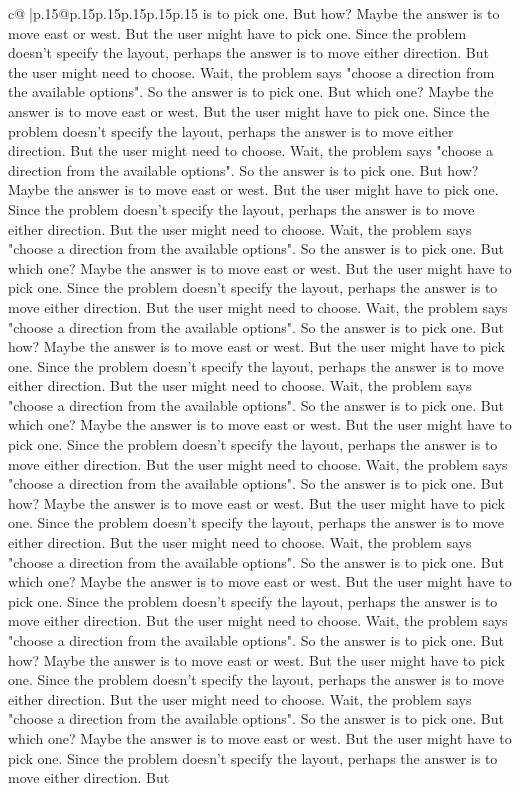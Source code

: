 \documentclass{article}
\begin{document}
{\begin{supertabular}{c@{$\;$}|p{.15\linewidth}@{}p{.15\linewidth}p{.15\linewidth}p{.15\linewidth}p{.15\linewidth}p{.15\linewidth}}
{{{is to pick one. But how? Maybe the answer is to move east or west. But the user might have to pick one. Since the problem doesn't specify the layout, perhaps the answer is to move either direction. But the user might need to choose. Wait, the problem says "choose a direction from the available options". So the answer is to pick one. But which one? Maybe the answer is to move east or west. But the user might have to pick one. Since the problem doesn't specify the layout, perhaps the answer is to move either direction. But the user might need to choose. Wait, the problem says "choose a direction from the available options". So the answer is to pick one. But how? Maybe the answer is to move east or west. But the user might have to pick one. Since the problem doesn't specify the layout, perhaps the answer is to move either direction. But the user might need to choose. Wait, the problem says "choose a direction from the available options". So the answer is to pick one. But which one? Maybe the answer is to move east or west. But the user might have to pick one. Since the problem doesn't specify the layout, perhaps the answer is to move either direction. But the user might need to choose. Wait, the problem says "choose a direction from the available options". So the answer is to pick one. But how? Maybe the answer is to move east or west. But the user might have to pick one. Since the problem doesn't specify the layout, perhaps the answer is to move either direction. But the user might need to choose. Wait, the problem says "choose a direction from the available options". So the answer is to pick one. But which one? Maybe the answer is to move east or west. But the user might have to pick one. Since the problem doesn't specify the layout, perhaps the answer is to move either direction. But the user might need to choose. Wait, the problem says "choose a direction from the available options". So the answer is to pick one. But how? Maybe the answer is to move east or west. But the user might have to pick one. Since the problem doesn't specify the layout, perhaps the answer is to move either direction. But the user might need to choose. Wait, the problem says "choose a direction from the available options". So the answer is to pick one. But which one? Maybe the answer is to move east or west. But the user might have to pick one. Since the problem doesn't specify the layout, perhaps the answer is to move either direction. But the user might need to choose. Wait, the problem says "choose a direction from the available options". So the answer is to pick one. But how? Maybe the answer is to move east or west. But the user might have to pick one. Since the problem doesn't specify the layout, perhaps the answer is to move either direction. But the user might need to choose. Wait, the problem says "choose a direction from the available options". So the answer is to pick one. But which one? Maybe the answer is to move east or west. But the user might have to pick one. Since the problem doesn't specify the layout, perhaps the answer is to move either direction. But 
	  } 
	   } 
	   } 
	  \\ 
 


\end{supertabular}}
\end{document}
